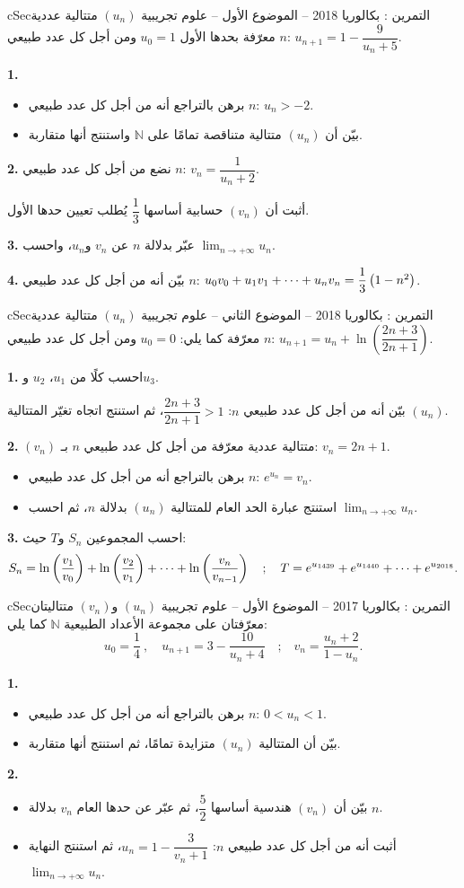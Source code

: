 \documentclass[12pt,a4paper]{article}
\newenvironment{BOX}[2]{\begin{otherlanguage}{english}\begin{arbox}{#1}{#2}}{\end{arbox}\end{otherlanguage}}
\newcounter{exo}
\newenvironment{tamrin}[1]{\stepcounter{exo}\begin{BOX}{cSec}{التمرين \theexo: #1}}{\end{BOX}}
\renewcommand{\cdots}{\mathinner{\cdotp\cdotp\cdotp}}
\newcommand{\N}{\mathbb{N}}
\newcommand{\limn}{\displaystyle\lim_{n\to+\infty}}
\newenvironment{sq}{\begin{itemize}[leftmargin=2.4em,itemsep=3pt]}{\end{itemize}}
\newcommand{\qa}{\item[(أ)]}\newcommand{\qb}{\item[(ب)]}\newcommand{\qc}{\item[(جـ)]}\newcommand{\qd}{\item[(د)]}\newcommand{\qe}{\item[(هـ)]}
\newcommand{\QQ}[1]{\par\smallskip\textbf{#1.} }
\begin{document}
\begin{tamrin}{بكالوريا 2018 -- الموضوع الأول -- علوم تجريبية}
$(u_n)$ متتالية عددية معرّفة بحدها الأول $u_0=1$ ومن أجل كل عدد طبيعي $n$: $u_{n+1}=1-\dfrac{9}{u_n+5}$.
\QQ{1}
\begin{sq}
\qa برهن بالتراجع أنه من أجل كل عدد طبيعي $n$: $u_n>-2$.
\qb بيّن أن $(u_n)$ متتالية متناقصة تمامًا على $\N$ واستنتج أنها متقاربة.
\end{sq}
\QQ{2} نضع من أجل كل عدد طبيعي $n$: $v_n=\dfrac{1}{u_n+2}$.

أثبت أن $(v_n)$ حسابية أساسها $\dfrac{1}{3}$ يُطلب تعيين حدها الأول.
\QQ{3} عبّر بدلالة $n$ عن $v_n$ و$u_n$، واحسب $\limn u_n$.
\QQ{4} بيّن أنه من أجل كل عدد طبيعي $n$: $u_0v_0+u_1v_1+\cdots+u_nv_n=\dfrac{1}{3}\left(1-n^2\right)$.
\end{tamrin}

\begin{tamrin}{بكالوريا 2018 -- الموضوع الثاني -- علوم تجريبية}
$(u_n)$ متتالية عددية معرّفة كما يلي: $u_0=0$ ومن أجل كل عدد طبيعي $n$: $u_{n+1}=u_n+\ln\left(\dfrac{2n+3}{2n+1}\right)$.
\QQ{1} احسب كلًا من $u_1$، $u_2$ و$u_3$.

بيّن أنه من أجل كل عدد طبيعي $n$: $\dfrac{2n+3}{2n+1}>1$، ثم استنتج اتجاه تغيّر المتتالية $(u_n)$.
\QQ{2} $(v_n)$ متتالية عددية معرّفة من أجل كل عدد طبيعي $n$ بـ: $v_n=2n+1$.
\begin{sq}
\qa برهن بالتراجع أنه من أجل كل عدد طبيعي $n$: $e^{u_n}=v_n$.
\qb استنتج عبارة الحد العام للمتتالية $(u_n)$ بدلالة $n$، ثم احسب $\limn u_n$.
\end{sq}
\QQ{3} احسب المجموعين $S_n$ و$T$ حيث:
\[S_n=\ln\left(\frac{v_1}{v_0}\right)+\ln\left(\frac{v_2}{v_1}\right)+\cdots+\ln\left(\frac{v_n}{v_{n-1}}\right)\quad;\quad T=e^{u_{1439}}+e^{u_{1440}}+\cdots+e^{u_{2018}}.\]
\end{tamrin}

\begin{tamrin}{بكالوريا 2017 -- الموضوع الأول -- علوم تجريبية}
$(u_n)$ و$(v_n)$ متتاليتان معرّفتان على مجموعة الأعداد الطبيعية $\N$ كما يلي:
\[u_0=\frac{1}{4}\ ,\quad u_{n+1}=3-\frac{10}{u_n+4}\quad\text{;}\quad v_n=\frac{u_n+2}{1-u_n}.\]
\QQ{1}
\begin{sq}
\qa برهن بالتراجع أنه من أجل كل عدد طبيعي $n$: $0<u_n<1$.
\qb بيّن أن المتتالية $(u_n)$ متزايدة تمامًا، ثم استنتج أنها متقاربة.
\end{sq}
\QQ{2}
\begin{sq}
\qa بيّن أن $(v_n)$ هندسية أساسها $\dfrac{5}{2}$، ثم عبّر عن حدها العام $v_n$ بدلالة $n$.
\qb أثبت أنه من أجل كل عدد طبيعي $n$: $u_n=1-\dfrac{3}{v_n+1}$، ثم استنتج النهاية $\limn u_n$.
\end{sq}
\end{tamrin}
\end{document}
